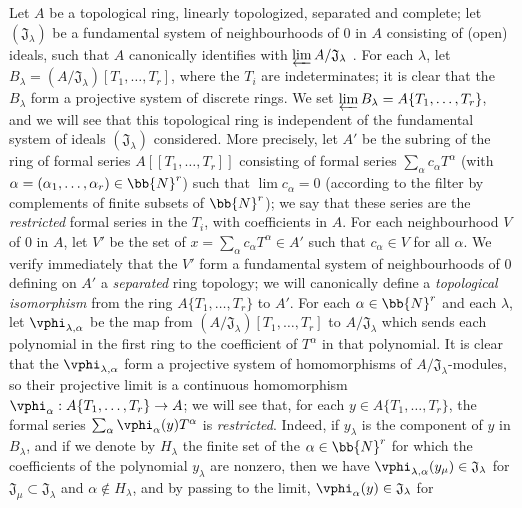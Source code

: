 \begin{env}[7.5.1]
\label{0.7.5.1}
Let $A$ be a topological ring, linearly topologized, separated and complete; let
$(\mathfrak{J}_\lambda)$ be a fundamental system of neighbourhoods of $0$ in $A$
consisting of (open) ideals, such that $A$ canonically identifies with
$\varprojlim A/\mathfrak{J}_\lambda$ . For each
$\lambda$, let $B_\lambda=(A/\mathfrak{J}_\lambda)[T_1,\dots,T_r]$, where the
$T_i$ are indeterminates; it is clear that the $B_\lambda$ form a projective system
of discrete rings. We set $\varprojlim B_\lambda=A\{T_1,\dots,T_r\}$, and we will
see that this topological ring is independent of the fundamental system of ideals
$(\mathfrak{J}_\lambda)$ considered. More precisely, let $A'$ be the subring of the
ring of formal series $A[\![T_1,\dots,T_r]\!]$ consisting of formal series
$\sum_\alpha c_\alpha T^\alpha$ (with $\alpha=(\alpha_1,\dots,\alpha_r)\in\bb{N}^r$)
such that $\lim c_\alpha=0$ (according to the filter by complements of finite subsets
of $\bb{N}^r$); we say that these series are the \emph{restricted} formal series in the
$T_i$, with coefficients in $A$.
For each neighbourhood $V$ of $0$ in $A$, let $V'$ be the set of
$x=\sum_\alpha c_\alpha T^\alpha\in A'$ such that $c_\alpha\in V$ for all $\alpha$.
We verify immediately that the $V'$ form a fundamental system of neighbourhoods of $0$
defining on $A'$ a \emph{separated} ring topology; we will canonically define a
\emph{topological isomorphism} from the ring $A\{T_1,\dots,T_r\}$ to $A'$. For each
$\alpha\in\bb{N}^r$ and each $\lambda$, let $\vphi_{\lambda,\alpha}$ be the map from
$(A/\mathfrak{J}_\lambda)[T_1,\dots,T_r]$ to $A/\mathfrak{J}_\lambda$ which sends each
polynomial in the first ring to the coefficient of $T^\alpha$ in that polynomial. It is
clear that the $\vphi_{\lambda,\alpha}$ form a projective system of homomorphisms of
$A/\mathfrak{J}_\lambda$-modules, so their projective limit is a continuous
homomorphism $\vphi_\alpha:A\{T_1,\dots,T_r\}\to A$; we will see that, for each
$y\in A\{T_1,\dots,T_r\}$, the formal series $\sum_\alpha\vphi_\alpha(y)T^\alpha$ is
\emph{restricted}. Indeed, if $y_\lambda$ is the component of $y$ in $B_\lambda$, and
if we denote by $H_\lambda$ the finite set of the $\alpha\in\bb{N}^r$ for which the
coefficients of the polynomial $y_\lambda$ are nonzero, then we have
$\vphi_{\lambda,\alpha}(y_\mu)\in\mathfrak{J}_\lambda$ for
$\mathfrak{J}_\mu\subset\mathfrak{J}_\lambda$ and $\alpha\not\in H_\lambda$, and by
passing to the limit, $\vphi_\alpha(y)\in\mathfrak{J}_\lambda$ for

\end{env}
